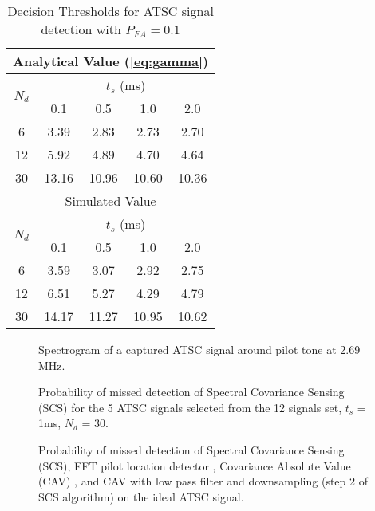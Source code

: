 \documentclass[draftclsnofoot,onecolumn,12pt]{IEEEtran}
\begin{document}
\begin{table}\centering
  \caption{Decision Thresholds for ATSC signal detection with $P_{FA} = 0.1$}
  \label{tbl:DecThr}
  \begin{tabular}{|c|c|c|c|c|}
    \hline
    \multicolumn{5}{|c|}{Analytical Value (\ref{eq:gamma})} \\ \hline
    \multirow{2}{0.5cm}{$N_d$}& \multicolumn{4}{c|}{$t_s$ (ms)} \\ \cline{2-5}
    	& 0.1    & 0.5   & 1.0   & 2.0 \\ \hline
	6	&  3.39  & 2.83  & 2.73  & 2.70 \\ \hline
	12	&  5.92  & 4.89  & 4.70  & 4.64 \\ \hline
	30	&  13.16 & 10.96 & 10.60 & 10.36 \\ \hline \hline
    \multicolumn{5}{|c|}{Simulated Value}  \\ \hline
    \multirow{2}{0.5cm}{$N_d$}& \multicolumn{4}{c|}{$t_s$ (ms)} \\ \cline{2-5}
    	& 0.1    & 0.5   & 1.0   & 2.0 \\ \hline
     	6	& 3.59     & 3.07    & 2.92   & 2.75 \\ \hline
     	12	& 6.51     & 5.27    & 4.29   & 4.79 \\ \hline
    	30	& 14.17    & 11.27   & 10.95  & 10.62 \\ \hline
  \end{tabular}
\end{table}


\begin{figure}[p]
  \centering
{}
  \caption{Spectrogram of a captured ATSC signal around pilot tone at 2.69 MHz.}
  \label{fig:ATSCspectrum}
\end{figure}


\begin{figure}[p]
  \centering
{}
  \caption{Probability of missed detection of Spectral Covariance Sensing (SCS) for the 5 ATSC signals selected from the 12 signals set, $t_s$ = 1ms, $N_d$ = 30.}
  \label{fig:SCS_Nd30_ts1_rho0}
\end{figure}


\begin{figure}[p]
  \centering
  \caption{Probability of missed detection of Spectral Covariance Sensing (SCS), FFT pilot location detector \cite{CorGho07}, Covariance Absolute Value (CAV) \cite{ZenLia09}, and CAV with low pass filter and downsampling (step 2 of SCS algorithm) on the ideal ATSC signal.}
  \label{fig:cleanATSC}
\end{figure}
\end{document}

